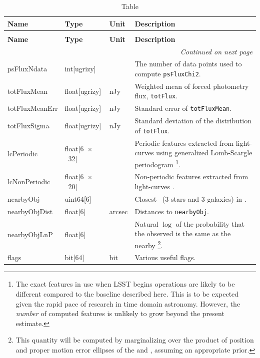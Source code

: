 \documentclass[SE,lsstdraft,toc]{lsstdoc}
\newcommand\x         {\hbox{$\times$}}
\newenvironment{schema}[3]{%
\setlength\LTleft{0pt}
\setlength\LTright{\fill}
\begin{longtable}{p{0.2\textwidth}p{0.14\textwidth}p{0.14\textwidth}p{0.41\textwidth}}

\caption[#1]{#2\label{#3}}\\

\hline \textbf{Name} & \textbf{Type} & \textbf{Unit} & \textbf{Description}\\ \hline
\endfirsthead

\caption[#1]{#2}\\

\hline \textbf{Name} & \textbf{Type} & \textbf{Unit} & \textbf{Description}\\ \hline
\endhead

\hline \multicolumn{4}{r}{\emph{Continued on next page}} \\
\endfoot

\hline\hline
\endlastfoot
}{%
\hline
\end{longtable}
}
\begin{document}
\begin{schema}{\DIAObject Table}{\DIAObject Table}{tbl:diaobjectTable}
psFluxNdata & int[ugrizy] & ~ & The number of data points used to compute \texttt{psFluxChi2}. \\

totFluxMean & float[ugrizy] & nJy & Weighted mean of forced photometry flux, \texttt{totFlux}.\\

totFluxMeanErr & float[ugrizy] & nJy & Standard error of \texttt{totFluxMean}. \\

totFluxSigma & float[ugrizy] & nJy & Standard deviation of the distribution of \texttt{totFlux}. \\





lcPeriodic & float[6~\x~32] & ~ & Periodic features extracted from light-curves using generalized Lomb-Scargle periodogram \citep[Table~4,][]{2011ApJ...733...10R}\footnote{The exact features in use when LSST begins operations are likely to be different compared to the baseline described here. This is to be expected given the rapid pace of research in time domain astronomy. However, the \emph{number} of computed features is unlikely to grow beyond the present estimate.}. \\

lcNonPeriodic & float[6~\x~20] & ~ & Non-periodic features extracted from light-curves \citep[Table~5,][]{2011ApJ...733...10R}. \\

nearbyObj   & uint64[6] & ~ & Closest \Objects\ (3 stars and 3 galaxies) in \DR.\\

nearbyObjDist   & float[6] & arcsec & Distances to \texttt{nearbyObj}. \\

nearbyObjLnP   & float[6] & ~ &  Natural $\log$ of the probability that the observed \DIAObject is the same as the nearby \Object\footnote{This quantity will be computed by marginalizing over the product of position and proper motion error ellipses of the \Object and \DIAObject, assuming an appropriate prior.}. \\

flags & bit[64] & bit & Various useful flags. \\

\end{schema}
\end{document}
